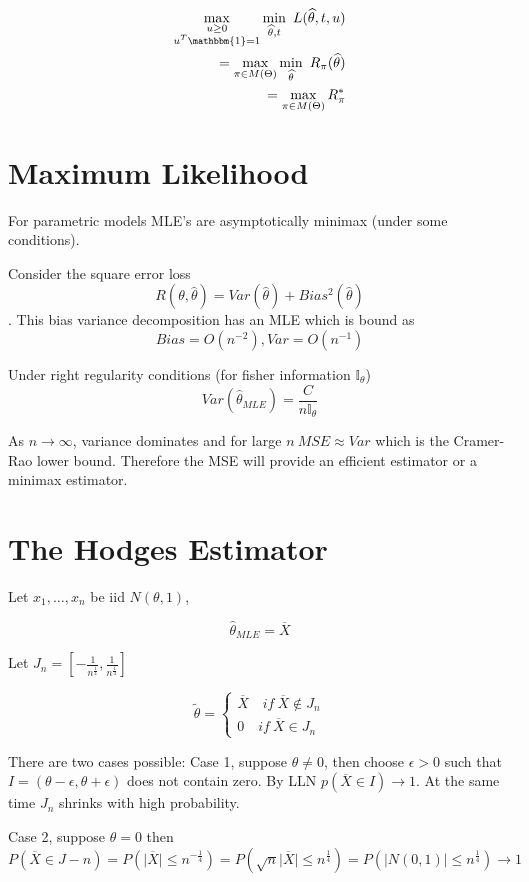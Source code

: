 \documentclass[10pt]{article}
\renewcommand{\bar}{\overline}
\renewcommand{\hat}{\widehat}
\begin{document}
	\begin{align*}
		\max\limits_{\substack{u\geq 0 \\ u^T \mathbbm{1}=1}} \min\limits_{\hat\theta,t}\  L(\hat\theta, t,u)\\
		= \max\limits_{\pi \in M(\Theta)} \min\limits_{\hat\theta}\ R_{\pi}(\hat\theta)\\
		= \max\limits_{\pi \in M(\Theta)} R^*_\pi
	\end{align*}
	
	\section*{Maximum Likelihood}
	For parametric models MLE's are asymptotically minimax (under some conditions).
	
	Consider the square error loss \[ R(\theta,\hat\theta) = Var(\hat\theta) + Bias^2(\hat\theta)\].
	This bias variance decomposition has an MLE which is bound as \[Bias=O(n^{-2}), Var=O(n^{-1})\]
	
	Under right regularity conditions (for fisher information $\mathbb{I}_\theta$)
	\[Var(\hat\theta_{MLE}) = \frac{C}{n\mathbb{I}_\theta}\]
	
	As $n\rightarrow \infty$, variance dominates and for large $n\ MSE\approx Var$ which is the Cramer-Rao lower bound. Therefore the MSE will provide an efficient estimator or a minimax estimator.
	
	\section*{The Hodges Estimator}
	
	Let $x_1, \ldots, x_n$ be iid $N(\theta,1)$,
	
	$$\hat\theta_{MLE} = \bar{X}$$
	
	Let $J_n = \left[ -\frac{1}{n^{\frac{1}{4}}}, \frac{1}{n^{\frac{1}{4}}} \right]$
	
	$$
	\tilde{\theta} = \begin{cases}
	\bar{X} \quad if\ \bar{X} \notin J_n \\
	0 \quad if\ \bar{X} \in J_n
	\end{cases}
	$$
	
	There are two cases possible:
	Case 1, suppose $\theta \neq 0 $, then choose $\epsilon > 0 $ such that $ I = (\theta-\epsilon,\theta+\epsilon)$ does not contain zero. By LLN $p(\bar{X} \in I ) \rightarrow 1 $. At the same time $J_n$ shrinks with high probability.
	
	Case 2, suppose $\theta=0$ then $P(\bar{X} \in J-n) = P(\lvert\bar{X}\rvert \leq n^{-\frac{1}{4}}) = P(\sqrt{n}\lvert \bar{X}\rvert \leq n^{\frac{1}{4}}) = P(\lvert N(0,1)\rvert \leq n^{\frac{1}{4}}) \rightarrow 1 $
	
\end{document}
